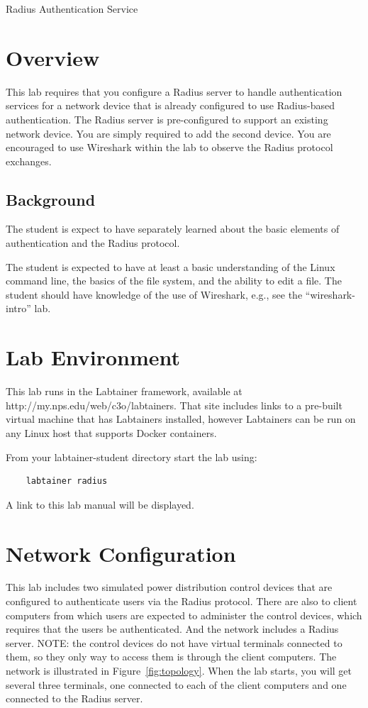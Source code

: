 


\begin{center}
{\LARGE Radius Authentication Service}
\vspace{0.1in}\\
\end{center}

\copyrightnotice

\section{Overview}
This lab requires that you configure a Radius server to handle authentication
services for a network device that is already configured to use Radius-based
authentication.  The Radius server is pre-configured to support an existing
network device.  You are simply required to add the second device.
You are encouraged to use Wireshark within the lab to observe the Radius
protocol exchanges.


\subsection {Background}
The student is expect to have separately learned about the basic elements of authentication
and the Radius protocol.

The student is expected to have at least a basic understanding of the Linux command line,
the basics of the file system, and the ability to edit a file.  The student should have
knowledge of the use of Wireshark, e.g., see the ``wireshark-intro'' lab.

\section{Lab Environment}
This lab runs in the Labtainer framework,
available at http://my.nps.edu/web/c3o/labtainers.
That site includes links to a pre-built virtual machine
that has Labtainers installed, however Labtainers can
be run on any Linux host that supports Docker containers.

From your labtainer-student directory start the lab using:
\begin{verbatim}
    labtainer radius
\end{verbatim}
\noindent A link to this lab manual will be displayed.  

\section{Network Configuration}
This lab includes two simulated power distribution control devices that
are configured to authenticate users via the Radius protocol.  There
are also to client computers from which users are expected to administer
the control devices, which requires that the users be authenticated.
And the network includes a Radius server.  NOTE: the control devices
do not have virtual terminals connected to them, so they only way to 
access them is through the client computers.  The network is
illustrated in Figure~\ref{fig:topology}.
When the lab starts, you will get several three terminals, one connected to each
of the client computers and one connected to the Radius server.

